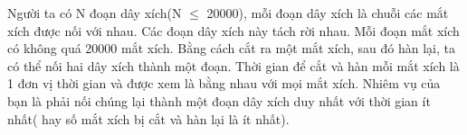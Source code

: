 Người ta có N đoạn dây xích(N  $\le$  20000), mỗi đoạn dây xích là  chuỗi các mắt xích được nối với nhau. Các đoạn dây xích này tách rời nhau. Mỗi đoạn mắt xích có không quá 20000 mắt xích.  Bằng cách cắt ra một mắt xích, sau đó hàn lại, ta có thể nối hai dây xích thành một đoạn. Thời gian để cắt và hàn mỗi mắt xích là 1 đơn vị thời gian và được xem là bằng nhau với mọi mắt xích.  Nhiêm vụ của bạn là phải nối chúng lại thành một đoạn dây xích duy nhất với thời gian ít nhất( hay số mắt xích bị cắt và hàn lại là ít nhất).